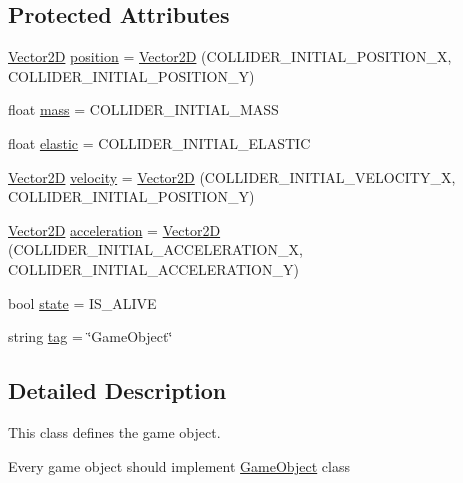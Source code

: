 \subsection*{Protected Attributes}
\begin{DoxyCompactItemize}
\item 
\mbox{\hyperlink{struct_vector2_d}{Vector2D}} \mbox{\hyperlink{class_game_object_a63c71615f7543ca8f39fc32b9478c6c8}{position}} = \mbox{\hyperlink{struct_vector2_d}{Vector2D}} (C\+O\+L\+L\+I\+D\+E\+R\+\_\+\+I\+N\+I\+T\+I\+A\+L\+\_\+\+P\+O\+S\+I\+T\+I\+O\+N\+\_\+X, C\+O\+L\+L\+I\+D\+E\+R\+\_\+\+I\+N\+I\+T\+I\+A\+L\+\_\+\+P\+O\+S\+I\+T\+I\+O\+N\+\_\+Y)
\item 
float \mbox{\hyperlink{class_game_object_acce2dc8ab8ad6c7ad39ded2cb2aee78f}{mass}} = C\+O\+L\+L\+I\+D\+E\+R\+\_\+\+I\+N\+I\+T\+I\+A\+L\+\_\+\+M\+A\+SS
\item 
float \mbox{\hyperlink{class_game_object_a2eb78f1c7e0746c3ddc11ed63cd752ba}{elastic}} = C\+O\+L\+L\+I\+D\+E\+R\+\_\+\+I\+N\+I\+T\+I\+A\+L\+\_\+\+E\+L\+A\+S\+T\+IC
\item 
\mbox{\hyperlink{struct_vector2_d}{Vector2D}} \mbox{\hyperlink{class_game_object_a80879281f771f2621c6726fa2db7e7cb}{velocity}} = \mbox{\hyperlink{struct_vector2_d}{Vector2D}} (C\+O\+L\+L\+I\+D\+E\+R\+\_\+\+I\+N\+I\+T\+I\+A\+L\+\_\+\+V\+E\+L\+O\+C\+I\+T\+Y\+\_\+X, C\+O\+L\+L\+I\+D\+E\+R\+\_\+\+I\+N\+I\+T\+I\+A\+L\+\_\+\+P\+O\+S\+I\+T\+I\+O\+N\+\_\+Y)
\item 
\mbox{\hyperlink{struct_vector2_d}{Vector2D}} \mbox{\hyperlink{class_game_object_a042eea8526905be5caea9386f00204fa}{acceleration}} = \mbox{\hyperlink{struct_vector2_d}{Vector2D}} (C\+O\+L\+L\+I\+D\+E\+R\+\_\+\+I\+N\+I\+T\+I\+A\+L\+\_\+\+A\+C\+C\+E\+L\+E\+R\+A\+T\+I\+O\+N\+\_\+X, C\+O\+L\+L\+I\+D\+E\+R\+\_\+\+I\+N\+I\+T\+I\+A\+L\+\_\+\+A\+C\+C\+E\+L\+E\+R\+A\+T\+I\+O\+N\+\_\+Y)
\item 
bool \mbox{\hyperlink{class_game_object_a18605215a43917ea9f761e82da0fd44c}{state}} = I\+S\+\_\+\+A\+L\+I\+VE
\item 
string \mbox{\hyperlink{class_game_object_af3e560c598ca121eb9190a8d10ab42ae}{tag}} = \char`\"{}Game\+Object\char`\"{}
\end{DoxyCompactItemize}


\subsection{Detailed Description}
This class defines the game object. 

Every game object should implement \mbox{\hyperlink{class_game_object}{Game\+Object}} class 

